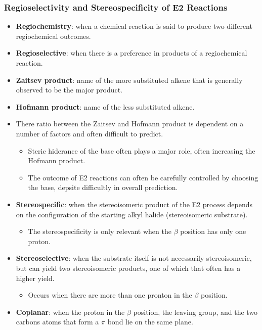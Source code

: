 \documentclass[12pt,a4paper]{article}
\begin{document}
\begin{itemize}
    \subsubsection{Regioselectivity and Stereospecificity of E2 Reactions}
    \begin{itemize}
        \item \textbf{Regiochemistry}: when a chemical reaction is said to produce two different regiochemical outcomes.
        \item \textbf{Regioselective}: when there is a preference in products of a regiochemical reaction.
        \item \textbf{Zaitsev product}: name of the more substituted alkene that is generally observed to be the major product.
        \item \textbf{Hofmann product}: name of the less substituted alkene.
        \item There ratio between the Zaitsev and Hofmann product is dependent on a number of factors and often difficult to predict.
            \begin{itemize}
                \item Steric hiderance of the base often plays a major role, often increasing the Hofmann product.
                \item The outcome of E2 reactions can often be carefully {\color{o-Sun} controlled by choosing the base}, depsite difficultly in overall prediction.
            \end{itemize}
        \item \textbf{Stereospecific}: when the stereoisomeric product of the E2 process depends on the configuration of the starting alkyl halide (stereoisomeric substrate).
            \begin{itemize}
                \item The stereospecificity is only relevant when the {\color{o-Sun}$\beta$ position has only one proton}.
            \end{itemize}
        \item \textbf{Stereoselective}: when the substrate itself is not necessarily stereoisomeric, but can yield two stereoisomeric products, one of which that often has a higher yield.
            \begin{itemize}
                \item Occurs when there are {\color{o-Sun}more than one pronton in the $\beta$ position}.
            \end{itemize}
        \item \textbf{Coplanar}: when the proton in the $\beta$ position, the leaving group, and the two carbons atoms that form a $\pi$ bond lie on the same plane.

\end{itemize}
\end{itemize}
\end{document}
